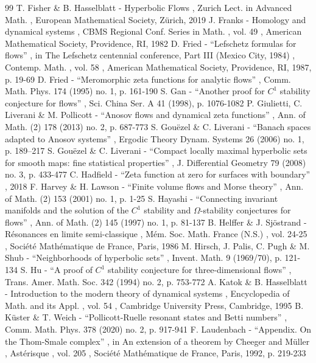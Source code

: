 \documentclass[11pt]{article}
\theoremstyle{definition}
\theoremstyle{plain}
\begin{document}
\begin{thebibliography}{99}
 T. Fisher \& B. Hasselblatt - Hyperbolic Flows , Zurich Lect. in Advanced Math. , European Mathematical Society, Zürich, 2019
 J. Franks - Homology and dynamical systems , CBMS Regional Conf. Series in Math. , vol. 49 , American Mathematical Society, Providence, RI, 1982
 D. Fried - “Lefschetz formulas for flows” , in The Lefschetz centennial conference, Part III (Mexico City, 1984) , Contemp. Math. , vol. 58 , American Mathematical Society, Providence, RI, 1987, p. 19-69
 D. Fried - “Meromorphic zeta functions for analytic flows” , Comm. Math. Phys. 174 (1995) no. 1, p. 161-190
 S. Gan - “Another proof for $C^1$ stability conjecture for flows” , Sci. China Ser. A 41 (1998), p. 1076-1082
 P. Giulietti, C. Liverani \& M. Pollicott - “Anosov flows and dynamical zeta functions” , Ann. of Math. (2) 178 (2013) no. 2, p. 687-773
 S. Gouëzel \& C. Liverani - “Banach spaces adapted to Anosov systems” , Ergodic Theory Dynam. Systems 26 (2006) no. 1, p. 189–217
 S. Gouëzel \& C. Liverani - “Compact locally maximal hyperbolic sets for smooth maps: fine statistical properties” , J. Differential Geometry 79 (2008) no. 3, p. 433-477
 C. Hadfield - “Zeta function at zero for surfaces with boundary” , 2018
 F. Harvey \& H. Lawson - “Finite volume flows and Morse theory” , Ann. of Math. (2) 153 (2001) no. 1, p. 1-25
 S. Hayashi - “Connecting invariant manifolds and the solution of the $C^1$ stability and $\Omega $-stability conjectures for flows” , Ann. of Math. (2) 145 (1997) no. 1, p. 81-137
 B. Helffer \& J. Sjöstrand - Résonances en limite semi-classique , Mém. Soc. Math. France (N.S.) , vol. 24-25 , Société Mathématique de France, Paris, 1986
 M. Hirsch, J. Palis, C. Pugh \& M. Shub - “Neighborhoods of hyperbolic sets” , Invent. Math. 9 (1969/70), p. 121-134
 S. Hu - “A proof of $C^1$ stability conjecture for three-dimensional flows” , Trans. Amer. Math. Soc. 342 (1994) no. 2, p. 753-772
 A. Katok \& B. Hasselblatt - Introduction to the modern theory of dynamical systems , Encyclopedia of Math. and its Appl. , vol. 54 , Cambridge University Press, Cambridge, 1995
 B. Küster \& T. Weich - “Pollicott-Ruelle resonant states and Betti numbers” , Comm. Math. Phys. 378 (2020) no. 2, p. 917-941
 F. Laudenbach - “Appendix. On the Thom-Smale complex” , in An extension of a theorem by Cheeger and Müller , Astérisque , vol. 205 , Société Mathématique de France, Paris, 1992, p. 219-233

\end{thebibliography}
\end{document}
